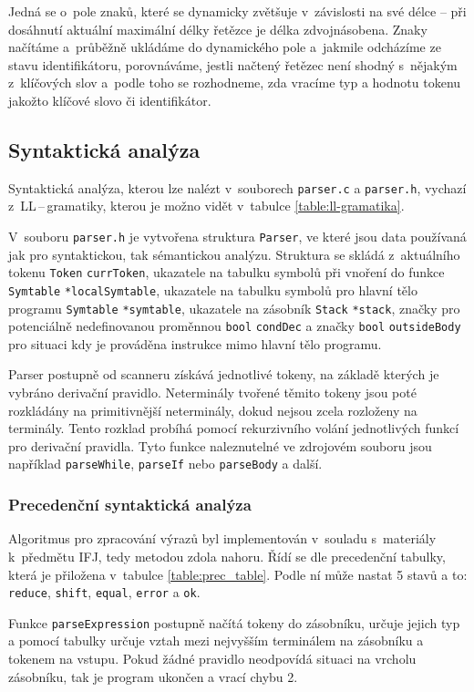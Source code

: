 \documentclass[a4paper,12pt]{article}
\begin{document}
Jedná se o~pole znaků, které se dynamicky zvětšuje v~závislosti na své délce -- při dosáhnutí aktuální maximální délky řetězce je délka zdvojnásobena. Znaky načítáme a~průběžně ukládáme do dynamického pole
a~jakmile odcházíme ze stavu identifikátoru, porovnáváme, jestli načtený řetězec není shodný s~nějakým z~klíčových slov a~podle
toho se rozhodneme, zda vracíme typ a hodnotu tokenu jakožto klíčové slovo či identifikátor.
\clearpage

\subsection{Syntaktická analýza}
Syntaktická analýza, kterou lze nalézt v~souborech \verb|parser.c| a \verb|parser.h|, vychazí z~LL\,--\,gramatiky, kterou je možno vidět v~tabulce \ref{table:ll-gramatika}.

V~souboru \verb|parser.h| je vytvořena struktura \verb|Parser|, ve které jsou data používaná jak pro syntaktickou, tak sémantickou analýzu. Struktura se skládá z~aktuálního tokenu \verb|Token| \verb|currToken|, ukazatele na tabulku symbolů při vnoření do funkce \verb|Symtable| \verb|*localSymtable|, ukazatele na tabulku symbolů pro hlavní tělo programu \verb|Symtable| \verb|*symtable|, ukazatele na zásobník \verb|Stack| \verb|*stack|, značky pro potenciálně nedefinovanou proměnnou \verb|bool| \verb|condDec| a značky \verb|bool| \verb|outsideBody| pro situaci kdy je prováděna instrukce mimo hlavní tělo programu.

Parser postupně od scanneru získává jednotlivé tokeny, na základě kterých je vybráno derivační pravidlo. Neterminály tvořené těmito tokeny jsou poté rozkládány na primitivnější neterminály, dokud nejsou zcela rozloženy na terminály. Tento rozklad probíhá pomocí rekurzivního volání jednotlivých funkcí pro derivační pravidla. Tyto funkce naleznutelné ve zdrojovém souboru jsou například \verb|parseWhile|, \verb|parseIf| nebo \verb|parseBody| a další.

\subsubsection{Precedenční syntaktická analýza}
Algoritmus pro zpracování výrazů byl implementován v~souladu s~materiály k~předmětu IFJ, tedy metodou zdola nahoru. Řídí se dle precedenční tabulky, která je přiložena v~tabulce \ref{table:prec_table}. Podle ní může nastat 5 stavů a to: \verb|reduce|, \verb|shift|, \verb|equal|, \verb|error| a \verb|ok|.

Funkce \verb|parseExpression| postupně načítá tokeny do zásobníku, určuje jejich typ a pomocí tabulky určuje vztah mezi nejvyšším terminálem na zásobníku a tokenem na vstupu. Pokud žádné pravidlo neodpovídá situaci na vrcholu zásobníku, tak je program ukončen a vrací chybu 2. %
\end{document}
